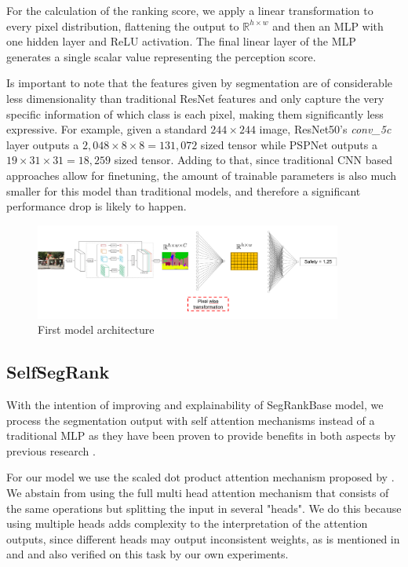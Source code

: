 For the calculation of the ranking score, we apply a linear transformation to every pixel distribution, flattening the output to
$\mathbb{R}^{h \times w}$  and then an MLP with one hidden layer and ReLU activation. The final linear layer
of the MLP generates a single scalar value representing the perception score.

Is important to note that the features given by  segmentation are  of considerable less dimensionality
than traditional ResNet features
and only capture the very specific information of which class is each pixel,
making them  significantly less expressive. For example, given a standard $244 \times 244$ image,
ResNet50's \textit{conv\_5c} layer outputs a $2,048 \times 8 \times 8 = 131,072$ sized
tensor while PSPNet outputs a $19 \times 31 \times 31 = 18,259$ sized tensor. Adding to that,
since traditional CNN based approaches allow for finetuning, the amount of trainable parameters
is also much smaller for this model than traditional models, and therefore a significant
performance drop is likely to happen.

\begin{figure}[ht]
	\begin{center}
	\includegraphics[width=0.9\textwidth]{./figures/segrank_1.png}
	\caption[First model architecture]{First model architecture}
	\label{fig:segrank_1}
	\end{center}
\end{figure}

\subsection{SelfSegRank}\label{section:self-attn}
With the intention of improving  and explainability of SegRankBase  model, we process
the segmentation output with self attention mechanisms instead of a traditional MLP as
they have been proven to provide benefits in both aspects by previous research \cite{vaswani_attention, wiegreffe_attention, cordonnier_relationship}.

For our model we use the scaled dot product attention mechanism
proposed by . We abstain from using the full multi head attention
mechanism  that consists of the same operations but splitting the input in several "heads".
We do this because using multiple heads adds complexity to the interpretation of the attention outputs,
since different heads may output inconsistent weights, as is mentioned in 
and  and also verified on this task by our own experiments.

